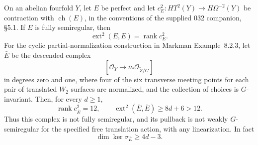 \begin{proposition}
\label{prop:semireg-fourfold-partial-normalization}
On an abelian fourfold $Y$, let $E$ be perfect and let
$c_E^2:HT^2(Y)\to H\Omega^{-2}(Y)$ be contraction with
$\operatorname{ch}(E)$, in the conventions of the supplied
032 companion, \S5.1. If $E$ is fully semiregular, then
\[
 \operatorname{ext}^2(E,E)=\operatorname{rank}c_E^2.
 \tag{S20.1}
\]
For the cyclic partial-normalization construction in Markman
Example~8.2.3, let $\bar E$ be the descended complex
\[
 [\mathcal O_Y\longrightarrow
       \bar\nu_*\mathcal O_{\widetilde Z/G}]
\]
in degrees zero and one, where four of the six transverse
meeting points for each pair of translated $W_2$ surfaces
are normalized, and the collection of choices is $G$-invariant.
Then, for every $d\ge1$,
\[
 \operatorname{rank}c_{\bar E}^2=12,
 \qquad
 \operatorname{ext}^2(\bar E,\bar E)\ge8d+6>12.
 \tag{S20.2}
\]
Thus this complex is not fully semiregular, and its pullback
is not weakly $G$-semiregular for the specified free translation
action, with any linearization. In fact
\[
 \dim\ker\sigma_{\bar E}\ge4d-3.
 \tag{S20.3}
\]
\end{proposition}
